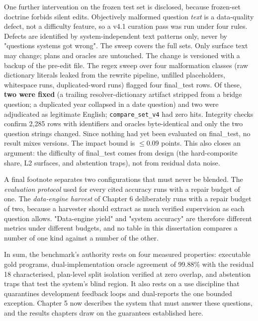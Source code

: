 One further intervention on the frozen test set is disclosed, because frozen-set doctrine forbids silent edits. Objectively malformed question \emph{text} is a data-quality defect, not a difficulty feature, so a v4.1 curation pass was run under four rules. Defects are identified by system-independent text patterns only, never by "questions systems got wrong". The sweep covers the full sets. Only surface text may change; plans and oracles are untouched. The change is versioned with a backup of the pre-edit file. The regex sweep over four malformation classes (raw dictionary literals leaked from the rewrite pipeline, unfilled placeholders, whitespace runs, duplicated-word runs) flagged four final\_test rows. Of these, \textbf{two were fixed} (a trailing resolver-dictionary artifact stripped from a bridge question; a duplicated year collapsed in a date question) and two were adjudicated as legitimate English; \texttt{compare\_set\_v4} had zero hits. Integrity checks confirm 2,285 rows with identifiers and oracles byte-identical and only the two question strings changed. Since nothing had yet been evaluated on final\_test, no result mixes versions. The impact bound is $\leq$0.09 points. This also closes an argument: the difficulty of final\_test comes from design (the hard-composite share, L2 surfaces, and abstention traps), not from residual data noise.

A final footnote separates two configurations that must never be blended. The \emph{evaluation protocol} used for every cited accuracy runs with a repair budget of one. The \emph{data-engine harvest} of Chapter 6 deliberately runs with a repair budget of two, because a harvester should extract as much verified supervision as each question allows. "Data-engine yield" and "system accuracy" are therefore different metrics under different budgets, and no table in this dissertation compares a number of one kind against a number of the other.

In sum, the benchmark's authority rests on four measured properties: executable gold programs, dual-implementation oracle agreement of 99.88\% with the residual 18 characterised, plan-level split isolation verified at zero overlap, and abstention traps that test the system's blind region. It also rests on a use discipline that quarantines development feedback loops and dual-reports the one bounded exception. Chapter 5 now describes the system that must answer these questions, and the results chapters draw on the guarantees established here.
